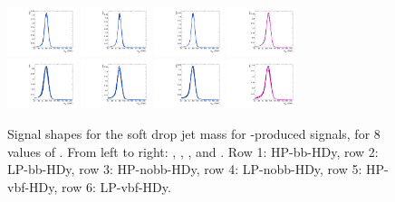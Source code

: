 \begin{figure}[htbp]
  \includegraphics[width=0.18\textwidth]{fig/analysis/templateSignalVsMX_fromDC_VBFGbuToWW_MJJ_mu_HP_vbf_DEtaHi.pdf}
  \includegraphics[width=0.18\textwidth]{fig/analysis/templateSignalVsMX_fromDC_VBFRadToWW_MJJ_mu_HP_vbf_DEtaHi.pdf}
  \includegraphics[width=0.18\textwidth]{fig/analysis/templateSignalVsMX_fromDC_VBFZprToWW_MJJ_mu_HP_vbf_DEtaHi.pdf}
  \includegraphics[width=0.18\textwidth]{fig/analysis/templateSignalVsMX_fromDC_VBFWprToWZ_MJJ_mu_HP_vbf_DEtaHi.pdf}\\
  \includegraphics[width=0.18\textwidth]{fig/analysis/templateSignalVsMX_fromDC_VBFGbuToWW_MJJ_mu_LP_vbf_DEtaHi.pdf}
  \includegraphics[width=0.18\textwidth]{fig/analysis/templateSignalVsMX_fromDC_VBFRadToWW_MJJ_mu_LP_vbf_DEtaHi.pdf}
  \includegraphics[width=0.18\textwidth]{fig/analysis/templateSignalVsMX_fromDC_VBFZprToWW_MJJ_mu_LP_vbf_DEtaHi.pdf}
  \includegraphics[width=0.18\textwidth]{fig/analysis/templateSignalVsMX_fromDC_VBFWprToWZ_MJJ_mu_LP_vbf_DEtaHi.pdf}\\
  \caption{
    Signal shapes for the soft drop jet mass \MJ for \VBF-produced signals, for 8 values of \MX.
    From left to right: \GBulktoWW, \RadtoWW, \ZprtoWW, and \WprtoWZ.
    Row 1: HP-bb-HDy, row 2: LP-bb-HDy, row 3: HP-nobb-HDy, row 4: LP-nobb-HDy, row 5: HP-vbf-HDy, row 6: LP-vbf-HDy.
  }
  \label{fig:MJJShapes_VBF_HDy_Run2}
\end{figure}

